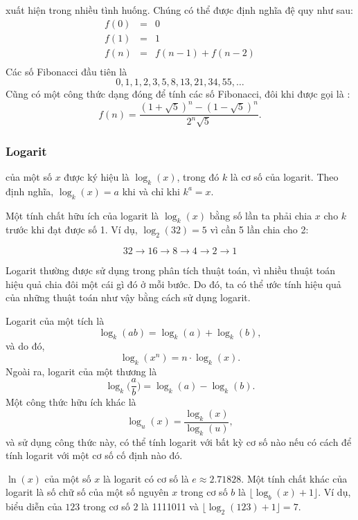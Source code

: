 
xuất hiện trong nhiều tình huống.
Chúng có thể được định nghĩa đệ quy như sau:
\[
\begin{array}{lcl}
f(0) & = & 0 \\
f(1) & = & 1 \\
f(n) & = & f(n-1)+f(n-2) \\
\end{array}
\]
Các số Fibonacci đầu tiên là
\[0, 1, 1, 2, 3, 5, 8, 13, 21, 34, 55, \ldots\]
Cũng có một công thức dạng đóng
để tính các số Fibonacci, đôi khi được gọi là
 :
\[f(n)=\frac{(1 + \sqrt{5})^n - (1-\sqrt{5})^n}{2^n \sqrt{5}}.\]

\subsubsection{Logarit}


 của một số $x$
được ký hiệu là $\log_k(x)$, trong đó $k$ là cơ số
của logarit.
Theo định nghĩa,
$\log_k(x)=a$ khi và chỉ khi $k^a=x$.

Một tính chất hữu ích của logarit là
$\log_k(x)$ bằng số lần
ta phải chia $x$ cho $k$ trước khi đạt được
số 1.
Ví dụ, $\log_2(32)=5$
vì cần 5 lần chia cho 2:

\[32 \rightarrow 16 \rightarrow 8 \rightarrow 4 \rightarrow 2 \rightarrow 1 \]

Logarit thường được sử dụng trong phân tích
thuật toán, vì nhiều thuật toán hiệu quả
chia đôi một cái gì đó ở mỗi bước.
Do đó, ta có thể ước tính hiệu quả của những thuật toán như vậy
bằng cách sử dụng logarit.

Logarit của một tích là
\[\log_k(ab) = \log_k(a)+\log_k(b),\]
và do đó,
\[\log_k(x^n) = n \cdot \log_k(x).\]
Ngoài ra, logarit của một thương là
\[\log_k\Big(\frac{a}{b}\Big) = \log_k(a)-\log_k(b).\]
Một công thức hữu ích khác là
\[\log_u(x) = \frac{\log_k(x)}{\log_k(u)},\]
và sử dụng công thức này, có thể tính
logarit với bất kỳ cơ số nào nếu có cách để
tính logarit với một cơ số cố định nào đó.


 $\ln(x)$ của một số $x$
là logarit có cơ số là $e \approx 2.71828$.
Một tính chất khác của logarit là
số chữ số của một số nguyên $x$ trong cơ số $b$ là
$\lfloor \log_b(x)+1 \rfloor$.
Ví dụ, biểu diễn của
$123$ trong cơ số $2$ là 1111011 và
$\lfloor \log_2(123)+1 \rfloor = 7$.

